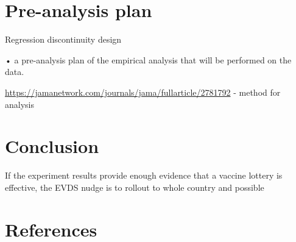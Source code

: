 \documentclass[11pt,preprint, authoryear]{elsarticle}
\numberwithin{equation}{section}
\numberwithin{figure}{section}
\numberwithin{table}{section}
\begin{document}
\hypertarget{pre-analysis-plan}{%
\section{\texorpdfstring{Pre-analysis plan
\label{pre}}{Pre-analysis plan }}\label{pre-analysis-plan}}

Regression discontinuity design

• a pre-analysis plan of the empirical analysis that will be performed
on the data.

\url{https://jamanetwork.com/journals/jama/fullarticle/2781792} - method
for analysis

\hfill

\hypertarget{conclusion}{%
\section{\texorpdfstring{Conclusion
\label{con}}{Conclusion }}\label{conclusion}}

If the experiment results provide enough evidence that a vaccine lottery
is effective, the EVDS nudge is to rollout to whole country and possible

\newpage

\hypertarget{references}{%
\section*{References}\label{references}}
\end{document}
